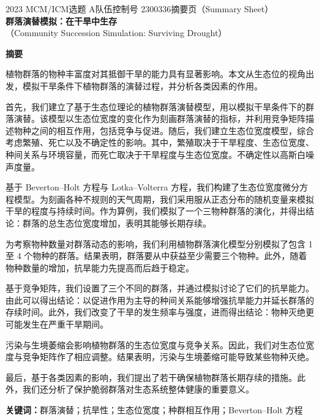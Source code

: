 \documentclass[11pt,a4paper]{ctexart}
\begin{document}
\thispagestyle{empty}
\begin{center}
{\small 2023 MCM/ICM\quad 选题 A\quad 队伍控制号 2300336\quad 摘要页（Summary Sheet）}\\[18pt]
{\LARGE\bfseries 群落演替模拟：在干旱中生存}\\[8pt]
{\large （Community Succession Simulation: Surviving Drought）}\\[10pt]
\end{center}

\begin{center}
{\large\bfseries 摘\quad 要}
\end{center}

\vspace{6pt}
植物群落的物种丰富度对其抵御干旱的能力具有显著影响。本文从生态位的视角出发，模拟干旱条件下植物群落的演替过程，并分析各类因素的作用。

首先，我们建立了基于生态位理论的植物群落演替模型，用以模拟干旱条件下的群落演替。该模型以生态位宽度的变化作为刻画群落演替的指标，并利用竞争矩阵描述物种之间的相互作用，包括竞争与促进。随后，我们建立生态位宽度模型，综合考虑繁殖、死亡以及不确定性的影响。其中，繁殖取决于干旱程度、生态位宽度、种间关系与环境容量，而死亡取决于干旱程度与生态位宽度。不确定性以高斯白噪声度量。

基于 Beverton--Holt 方程与 Lotka--Volterra 方程，我们构建了生态位宽度微分方程模型。为刻画各种不规则的天气周期，我们采用服从正态分布的随机变量来模拟干旱的程度与持续时间。作为算例，我们模拟了一个三物种群落的演化，并得出结论：群落的总生态位宽度增加，表明其能够长期存续。

为考察物种数量对群落动态的影响，我们利用植物群落演化模型分别模拟了包含 1 至 4 个物种的群落。结果表明，群落要从中获益至少需要三个物种。此外，随着物种数量的增加，抗旱能力先提高而后趋于稳定。

基于竞争矩阵，我们设置了三个不同的群落，并通过模拟讨论了它们的抗旱能力。由此可以得出结论：以促进作用为主导的种间关系能够增强抗旱能力并延长群落的存续时间。此外，我们改变了干旱的发生频率与强度，进而得出结论：物种灭绝更可能发生在严重干旱期间。

污染与生境萎缩会影响植物群落的生态位宽度与竞争关系。因此，我们对生态位宽度与竞争矩阵作了相应调整。结果表明，污染与生境萎缩可能导致某些物种灭绝。

最后，基于各类因素的影响，我们提出了若干确保植物群落长期存续的措施。此外，我们还分析了保护脆弱群落对生态系统整体健康的重要意义。

\vspace{6pt}
\noindent\textbf{关键词：}群落演替；抗旱性；生态位宽度；种群相互作用；Beverton--Holt 方程
\end{document}

